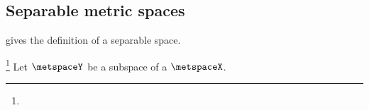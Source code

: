 







\subsection{Separable metric spaces}
 gives the definition of a separable space.
\begin{theorem}
\footnote{
  }
\label{thm:XdYd_separable}
Let $\metspaceY$ be a subspace of a  $\metspaceX$.

\end{theorem}

